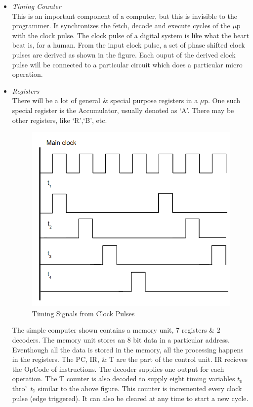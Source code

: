 \documentclass{book}
\begin{document}
\begin{itemize}
  \item\textit{Timing Counter} \\[5pt]
  This is an important component of a computer, but this is invisible to the programmer. It synchronizes the fetch, decode and execute cycles of the $\mu$p with the clock pulse. The clock pulse of a digital system is like what the heart beat is, for a human. From the input clock pulse, a set of phase shifted clock pulses are derived as shown in the figure. Each ouput of the derived clock pulse will be connected to a particular circuit which does a particular micro operation. 



  \item\textit{Registers} \\[5pt]
  There will be a lot of general \& special purpose registers in a $\mu$p. One such special register is the Accumulator, usually denoted as \lq A\rq. There may be other registers, like \lq R\rq,\lq B\rq, etc.

\begin{figure}[h]

\begin{center}
  \includegraphics[scale=.35]{imgs/clock.png}
\end{center}
\caption{Timing Signals from Clock Pulses}
\end{figure}



The simple computer shown contains a memory unit, 7 registers \& 2 decoders. The memory unit stores an 8 bit data in a particular address. Eventhough all the data is stored in the memory, all the processing happens in the registers. The PC, IR, \& T are the part of the control unit. IR recieves the OpCode of instructions. The decoder supplies one output for each operation. The T counter is also decoded to supply eight timing variables $t_0$ thro\rq\ $t_7$ similar to the above figure. This counter is incremented every clock pulse (edge triggered). It can also be cleared at any time to start a new cycle.

\end{itemize}
\end{document}
